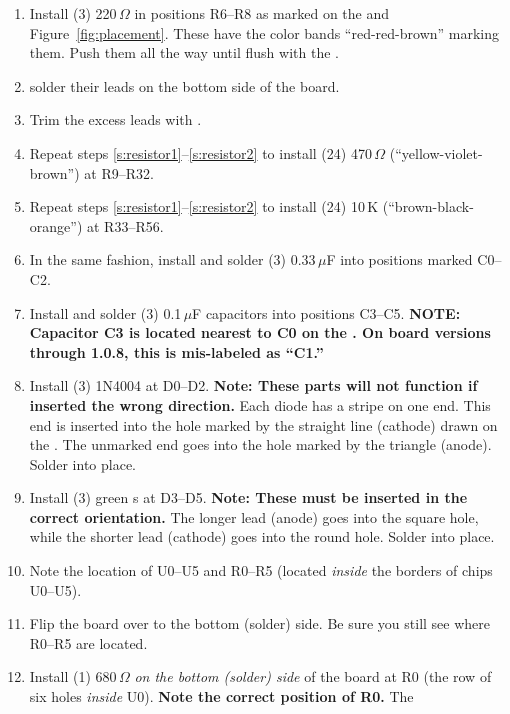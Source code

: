 \documentclass[letterpaper,twoside,onecolumn,openright,final]{memoir}
\begin{document}
\begin{enumerate}

\item\label{s:resistor1}
	Install (3) 220\,$\Omega$  in positions R6--R8 as marked on the 
	and Figure~\ref{fig:placement}.  These have the color bands ``red-red-brown'' 
	marking them.  Push them all the way until flush with the .
\item	solder their leads on the bottom side of the board.  
\item\label{s:resistor2}
	Trim the excess leads with .
\item	Repeat steps \ref{s:resistor1}--\ref{s:resistor2} to 
	install (24) 470\,$\Omega$  (``yellow-violet-brown'') at R9--R32.
\item	Repeat steps \ref{s:resistor1}--\ref{s:resistor2}
	to install (24) 10\,K  (``brown-black-orange'') at R33--R56.
\item	In the same fashion, install and solder (3) 0.33\,$\mu$F  into positions marked C0--C2.
\item	Install and solder (3) 0.1\,$\mu$F capacitors into positions C3--C5.
	{\bfseries NOTE: Capacitor C3 is located nearest to C0 on the . On
	board versions through 1.0.8, this is mis-labeled as ``C1.''}
\item	Install (3) 1N4004  at D0--D2.  {\bfseries Note: These parts will not function
	if inserted the wrong direction.} Each diode has
	a stripe on one end. This end is inserted into the hole marked by the straight line (cathode)
	drawn on the .  The unmarked end goes into the hole marked by the triangle
	(anode).  Solder into place. 
\item	Install (3) green s at D3--D5.  {\bfseries Note: These must be inserted in the 
	correct orientation.} The longer lead (anode) goes into the square hole, while the shorter
	lead (cathode) goes into the round hole.  Solder into place.
\item	Note the location of U0--U5 and R0--R5 (located \emph{inside} the borders of chips U0--U5).
\item	Flip the board over to the bottom (solder) side.  Be sure you still see where R0--R5 are
	located.
\item\label{s:R0s}
	Install (1) 680\,$\Omega$  \emph{on the bottom (solder) side} of the board at
	R0 (the row of six holes \emph{inside} U0).  {\bfseries Note the correct position of R0.} The

\end{enumerate}
\end{document}
